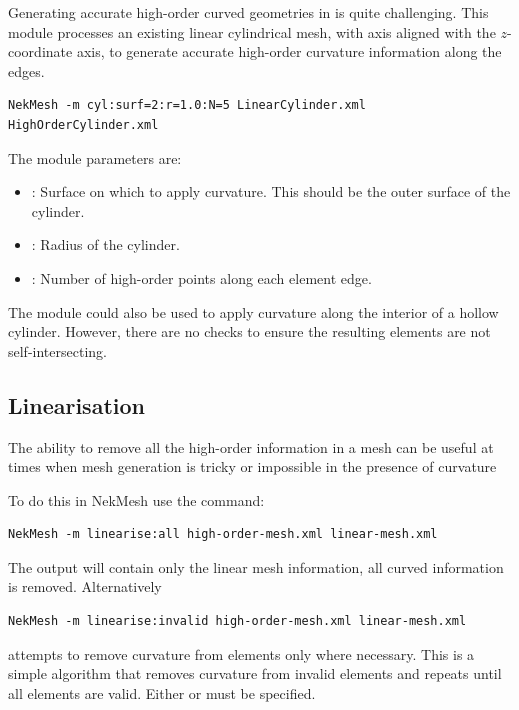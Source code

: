 Generating accurate high-order curved geometries in \gmsh is quite challenging.
This module processes an existing linear cylindrical mesh, with axis aligned
with the $z$-coordinate axis, to generate accurate high-order curvature
information along the edges.

\begin{lstlisting}[style=BashInputStyle]
NekMesh -m cyl:surf=2:r=1.0:N=5 LinearCylinder.xml HighOrderCylinder.xml
\end{lstlisting}

The module parameters are:

\begin{itemize}
  \item {}: Surface on which to apply curvature. This should be the
  outer surface of the cylinder.
  \item {}: Radius of the cylinder.
  \item {}: Number of high-order points along each element edge.
\end{itemize}

\begin{notebox}
  The module could also be used to apply curvature along the interior of a
  hollow cylinder. However, there are no checks to ensure the resulting elements
  are not self-intersecting.
\end{notebox}

\subsection{Linearisation}

The ability to remove all the high-order information in a mesh can be useful at
times when mesh generation is tricky or impossible in the presence of curvature

To do this in NekMesh use the command:

\begin{lstlisting}[style=BashInputStyle]
  NekMesh -m linearise:all high-order-mesh.xml linear-mesh.xml
\end{lstlisting}

The output will contain only the linear mesh information, all curved information
is removed. Alternatively

\begin{lstlisting}[style=BashInputStyle]
  NekMesh -m linearise:invalid high-order-mesh.xml linear-mesh.xml
\end{lstlisting}

attempts to remove curvature from elements only where necessary. This is a
simple algorithm that removes curvature from invalid elements and repeats until
all elements are valid. Either  or  must be specified.

